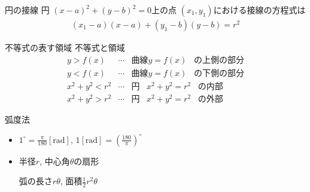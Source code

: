 \documentclass[aspectratio=169, 12pt]{beamer} %
\begin{document}
\begin{frame}{円の接線}
    円 $(x-a)^2+(y-b)^2=0$上の点 $(x_1, y_1)$における接線の方程式は
    \begin{eqnarray*}
        (x_1-a)(x-a)+(y_1-b)(y-b)=r^2
    \end{eqnarray*}
\end{frame}
\begin{frame}{不等式の表す領域}
    不等式と領域
    \begin{eqnarray*}
        y>f(x)&\cdots&\text{曲線}y=f(x)\;\;\;\text{の上側の部分} \\
        y<f(x)&\cdots&\text{曲線}y=f(x)\;\;\;\text{の下側の部分} \\
        x^2+y^2<r^2&\cdots&\text{円}\;\;\;x^2+y^2=r^2\;\;\;\text{の内部} \\
        x^2+y^2>r^2&\cdots&\text{円}\;\;\;x^2+y^2=r^2\;\;\;\text{の外部}
    \end{eqnarray*}
\end{frame}
\begin{frame}{弧度法}
    \begin{itemize}
        \item $1^\circ = \frac{\pi}{180} [\text{rad}]$, $1 [\text{rad}] = \left(\frac{180}{\pi}\right)^\circ$
        \item 半径$r$, 中心角$\theta$の扇形 \par
              弧の長さ$r\theta$, 面積$\frac{1}{2}r^2\theta$
    \end{itemize}

\end{frame}
\end{document}
